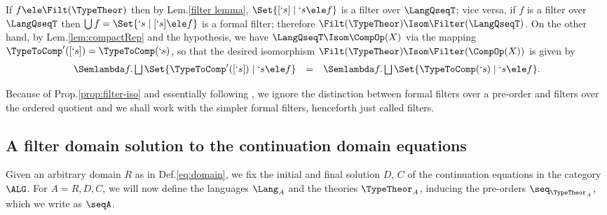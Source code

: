 \documentclass{CSML}
\begin{document}
\proof%
If $f \ele \Filt(\TypeTheor)$ then by Lem.\skp\ref{filter lemma}, $\Set{[`s] \mid `s \ele f}$ is a filter over $\LangQseqT$; vice versa, if $f$ is a filter over $\LangQseqT$ then $\bigcup f = \Set{`s \mid [`s] \ele f}$ is a formal filter; therefore $\Filt(\TypeTheor) \Isom \Filter(\LangQseqT)$. 
On the other hand, by Lem.\skp\ref{lem:compactRep} and the hypothesis, we have $\LangQseqT \Isom \CompOp(X)$ via the mapping $ \TypeToComp'([`s]) = \TypeToComp(`s)$, so that the desired isomorphism $\Filt(\TypeTheor) \Isom\Filter(\CompOp(X))$ is given by 
%
 \[ \begin{array}{rcl} 
 \Semlambda f . \bigsqcup \Set{\TypeToComp'([`s]) \mid `s \ele f} 
	&=& 
 \Semlambda f . \bigsqcup \Set{\TypeToComp(`s) \mid `s \ele f}. 
 \end{array} \]
\arrayqed[-28pt]

\noindent Because of Prop.\skp\ref{prop:filter-iso} and essentially following \cite{BCD'83}, we ignore the distinction between formal filters over a pre-order and filters over the ordered quotient and we shall work with the simpler formal filters, henceforth just called filters.

 \subsection{A filter domain solution to the continuation domain equations} \label{filter-model-solution}

Given an arbitrary domain $R$ as in Def.\skp\ref{eq:domain}, we fix the initial and final solution $D$, $C$ of the continuation equations in the category $\ALG$. 
For $A = R,D,C$, we will now define the languages $\Lang_A$ and the theories $\TypeTheor_A$, inducing the pre-orders $\seq_{\TypeTheor_A}$, which we write as $\seqA$. 
\end{document}
